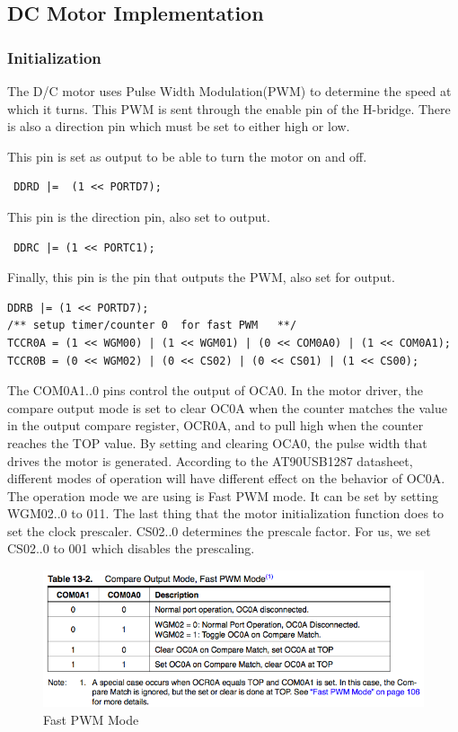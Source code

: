 \subsection{DC Motor Implementation}

\subsubsection{Initialization}
The D/C motor uses Pulse Width Modulation(PWM) to determine the speed at which it turns. This PWM is sent through the enable pin of the H-bridge. There is also a direction pin which must be set to either high or low.

This pin is set as output to be able to turn the motor on and off.
\begin{lstlisting}
 DDRD |=  (1 << PORTD7);
\end{lstlisting}

This pin is the direction pin, also set to output. 

\begin{lstlisting}
 DDRC |= (1 << PORTC1);
\end{lstlisting}

Finally, this pin is the pin that outputs the PWM, also set for output. 

\begin{lstlisting}
DDRB |= (1 << PORTD7);
/** setup timer/counter 0  for fast PWM   **/ 
TCCR0A = (1 << WGM00) | (1 << WGM01) | (0 << COM0A0) | (1 << COM0A1);
TCCR0B = (0 << WGM02) | (0 << CS02) | (0 << CS01) | (1 << CS00);
\end{lstlisting}

The COM0A1..0 pins control the output of OCA0. In the motor driver, the compare output mode is set to clear OC0A when the counter matches the value in the output compare register, OCR0A, and to pull high when the counter reaches the TOP value. By setting and clearing OCA0, the pulse width that drives the motor is generated. According to the AT90USB1287 datasheet, different modes of operation will have different effect on the behavior of OC0A. The operation mode we are using is Fast PWM mode. It can be set by setting WGM02..0 to 011. The last thing that the motor initialization function does to set the clock prescaler. CS02..0 determines the prescale factor. For us, we set CS02..0 to 001 which disables the prescaling.

\begin{figure}[tbp]
  \begin{center}
    \includegraphics[width=125mm]{imageSources/pwmTable1.png}
  \end{center}
  \caption{Fast PWM Mode} 
  \label{pwmTable1}
\end{figure}

